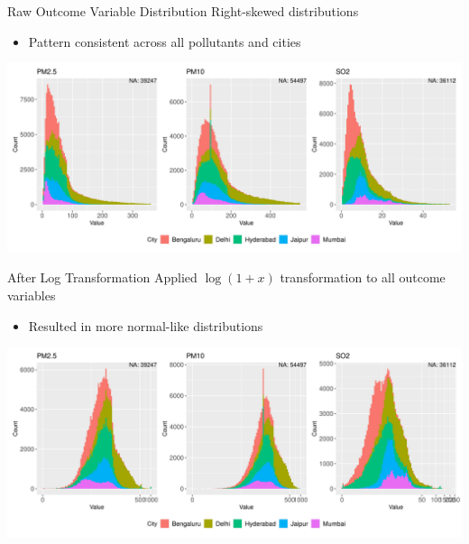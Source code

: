 \documentclass[svgnames, 12pt]{beamer}
\begin{document}
\begin{frame}{Raw Outcome Variable Distribution}
    Right-skewed distributions
    \begin{itemize}
        \item Pattern consistent across all pollutants and cities
    \end{itemize}
    \vspace{1em}
    \begin{center}
        \includegraphics[width=\textwidth]{assets/skewness.png}
    \end{center}
    \vfill
\end{frame}

\begin{frame}{After Log Transformation}
    Applied $\log(1 + x)$ transformation to all outcome variables
    \begin{itemize}
        \item Resulted in more normal-like distributions
    \end{itemize}
    \vspace{1em}
    \begin{center}
        \includegraphics[width=\textwidth]{assets/log-scaled-pollutants.png}
    \end{center}
    \vfill
\end{frame}
\end{document}
